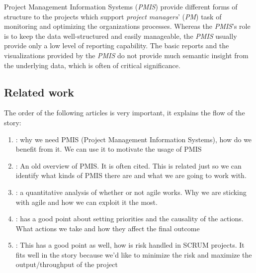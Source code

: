 \documentclass[a4paper, 12pt]{article}
\begin{document}

Project Management Information Systems (\textit{PMIS}) provide different forms of structure to the projects which support \textit{project managers}' (\textit{PM}) task of monitoring and optimizing the organizations processes. Whereas the \textit{PMIS}'s role is to keep the data well-structured and easily manageable, the \textit{PMIS} usually provide only a low level of reporting capability. The basic reports and the visualizations provided by the \textit{PMIS} do not provide much semantic insight from the underlying data, which is often of critical significance. 

\subsection{Related work}


The order of the following articles is very important, it explains the flow of the story:

\begin{enumerate}
	\item \cite{CANIELS2012162}: why we need PMIS  (Project Management Information Systems), how do we benefit from it. We can use it to motivate the usage of PMIS

	\item \cite{RAYMOND2008213}: An old overview of PMIS. It is often cited. This is related just so we can identify what kinds of PMIS there are and what we are going to work with.

	\item \cite{SERRADOR20151040}: a quantitative analysis of whether or not agile works. Why we are sticking with agile and how we can exploit it the most.

	\item \cite{Toole2006APM}: has a good point about setting priorities and the causality of the actions. What actions we take and how they affect the final outcome

	\item \cite{tavares2019risk}: This has a good point as well, how is risk handled in SCRUM projects. It fits well in the story because we'd like to minimize the risk and maximize the output/throughput of the project

\end{enumerate}
\end{document}
